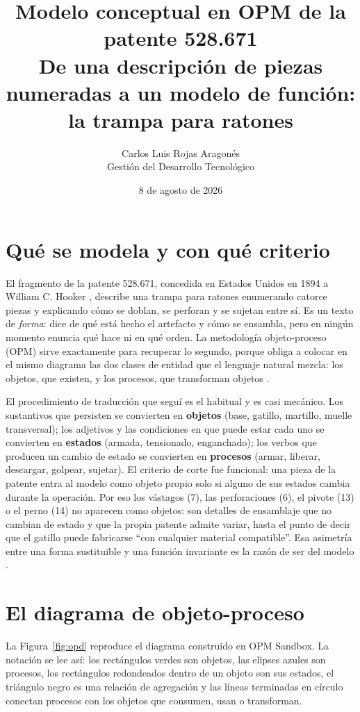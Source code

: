 \documentclass[11pt,letterpaper]{article}
\title{\vspace{-1.2cm}\textbf{Modelo conceptual en OPM de la patente 528.671}\\
\large De una descripción de piezas numeradas a un modelo de función:
la trampa para ratones}
\author{Carlos Luis Rojas Aragonés\\
\small Gestión del Desarrollo Tecnológico}
\date{\small 8 de agosto de 2026}
\begin{document}
\maketitle
\vspace{-0.8em}

\section*{Qué se modela y con qué criterio}

El fragmento de la patente 528.671, concedida en Estados Unidos en 1894 a
William C. Hooker \parencite{hooker1894}, describe una trampa para ratones
enumerando catorce piezas y explicando cómo se doblan, se perforan y se sujetan
entre sí. Es un texto de \emph{forma}: dice de qué está hecho el artefacto y
cómo se ensambla, pero en ningún momento enuncia qué hace ni en qué orden. La
metodología objeto-proceso (OPM) sirve exactamente para recuperar lo segundo,
porque obliga a colocar en el mismo diagrama las dos clases de entidad que el
lenguaje natural mezcla: los objetos, que existen, y los procesos, que
transforman objetos \parencite{dori2002,iso19450}.

El procedimiento de traducción que seguí es el habitual y es casi mecánico.
Los sustantivos que persisten se convierten en \textbf{objetos} (base, gatillo,
martillo, muelle transversal); los adjetivos y las condiciones en que puede
estar cada uno se convierten en \textbf{estados} (armada, tensionado,
enganchado); los verbos que producen un cambio de estado se convierten en
\textbf{procesos} (armar, liberar, descargar, golpear, sujetar). El criterio de
corte fue funcional: una pieza de la patente entra al modelo como objeto propio
solo si alguno de sus estados cambia durante la operación. Por eso los vástagos
(7), las perforaciones (6), el pivote (13) o el perno (14) no aparecen como
objetos: son detalles de ensamblaje que no cambian de estado y que la propia
patente admite variar, hasta el punto de decir que el gatillo puede fabricarse
\enquote{con cualquier material compatible}. Esa asimetría entre una forma
sustituible y una función invariante es la razón de ser del modelo
\parencite{crawley2016}.

\section*{El diagrama de objeto-proceso}

La Figura~\ref{fig:opd} reproduce el diagrama construido en OPM Sandbox. La
notación se lee así: los rectángulos verdes son objetos, las elipses azules son
procesos, los rectángulos redondeados dentro de un objeto son sus estados, el
triángulo negro es una relación de agregación y las líneas terminadas en círculo
conectan procesos con los objetos que consumen, usan o transforman.
\end{document}
